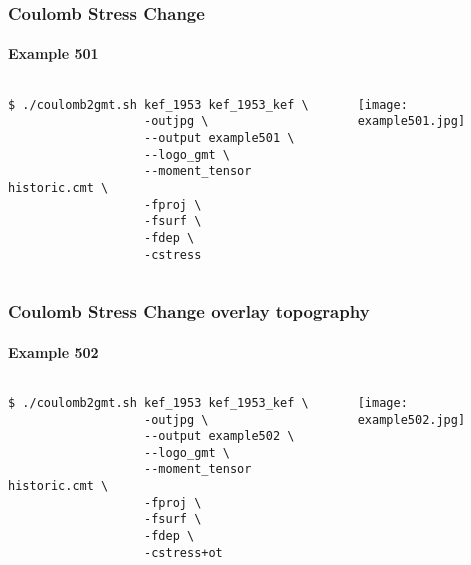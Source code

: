 \begin{frame}[t,fragile]
  \frametitle{Coulomb Stress Change}
  \framesubtitle{Example 501}
  \label{ch5fr:ex501}
\begin{columns}[t]
  \begin{column}{.5\textwidth}
\begin{scriptsize}
\begin{verbatim}
$ ./coulomb2gmt.sh kef_1953 kef_1953_kef \
                   -outjpg \ 
                   --output example501 \
                   --logo_gmt \
                   --moment_tensor historic.cmt \
                   -fproj \
                   -fsurf \
                   -fdep \
                   -cstress
\end{verbatim}
\end{scriptsize}

  \end{column}
  \begin{column}{.5\textwidth}

\centering
  \texttt{[image: example501.jpg]}
  \end{column}
\end{columns}

\end{frame}
\note{}

\begin{frame}[t,fragile]
  \frametitle{Coulomb Stress Change overlay topography}
  \framesubtitle{Example 502}
  \label{ch5fr:ex502}
\begin{columns}[t]
  \begin{column}{.5\textwidth}
\begin{scriptsize}
\begin{verbatim}
$ ./coulomb2gmt.sh kef_1953 kef_1953_kef \
                   -outjpg \ 
                   --output example502 \
                   --logo_gmt \
                   --moment_tensor historic.cmt \
                   -fproj \
                   -fsurf \
                   -fdep \
                   -cstress+ot
\end{verbatim}
\end{scriptsize}

  \end{column}
  \begin{column}{.5\textwidth}

\centering
  \texttt{[image: example502.jpg]}
  \end{column}
\end{columns}

\end{frame}
\note{}

